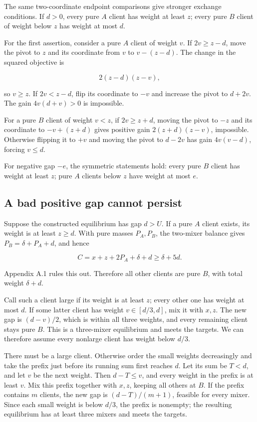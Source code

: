 \documentclass[11pt,a4paper]{article}
\begin{document}
The same two-coordinate endpoint comparisons give stronger exchange conditions. If \(d>0\), every pure \(A\) client has weight at least \(z\); every pure \(B\) client of weight below \(z\) has weight at most \(d\).

For the first assertion, consider a pure \(A\) client of weight \(v\). If \(2v\ge z-d\), move the pivot to \(z\) and its coordinate from \(v\) to \(v-(z-d)\). The change in the squared objective is

\[
2(z-d)(z-v),
\]

so \(v\ge z\). If \(2v<z-d\), flip its coordinate to \(-v\) and increase the pivot to \(d+2v\). The gain \(4v(d+v)>0\) is impossible.

For a pure \(B\) client of weight \(v<z\), if \(2v\ge z+d\), moving the pivot to \(-z\) and its coordinate to \(-v+(z+d)\) gives positive gain \(2(z+d)(z-v)\), impossible. Otherwise flipping it to \(+v\) and moving the pivot to \(d-2v\) has gain \(4v(v-d)\), forcing \(v\le d\).

For negative gap \(-e\), the symmetric statements hold: every pure \(B\) client has weight at least \(z\); pure \(A\) clients below \(z\) have weight at most \(e\).

\hypertarget{a-bad-positive-gap-cannot-persist}{%
\subsection{A bad positive gap cannot persist}\label{a-bad-positive-gap-cannot-persist}}

Suppose the constructed equilibrium has gap \(d>U\). If a pure \(A\) client exists, its weight is at least \(z\ge d\). With pure masses \(P_A,P_B\), the two-mixer balance gives \(P_B=\delta+P_A+d\), and hence

\[
C=x+z+2P_A+\delta+d\ge\delta+5d.
\]

Appendix A.1 rules this out. Therefore all other clients are pure \(B\), with total weight \(\delta+d\).

Call such a client large if its weight is at least \(z\); every other one has weight at most \(d\). If some latter client has weight \(v\in[d/3,d]\), mix it with \(x,z\). The new gap is \((d-v)/2\), which is within all three weights, and every remaining client stays pure \(B\). This is a three-mixer equilibrium and meets the targets. We can therefore assume every nonlarge client has weight below \(d/3\).

There must be a large client. Otherwise order the small weights decreasingly and take the prefix just before its running sum first reaches \(d\). Let its sum be \(T<d\), and let \(v\) be the next weight. Then \(d-T\le v\), and every weight in the prefix is at least \(v\). Mix this prefix together with \(x,z\), keeping all others at \(B\). If the prefix contains \(m\) clients, the new gap is \((d-T)/(m+1)\), feasible for every mixer. Since each small weight is below \(d/3\), the prefix is nonempty; the resulting equilibrium has at least three mixers and meets the targets.
\end{document}
